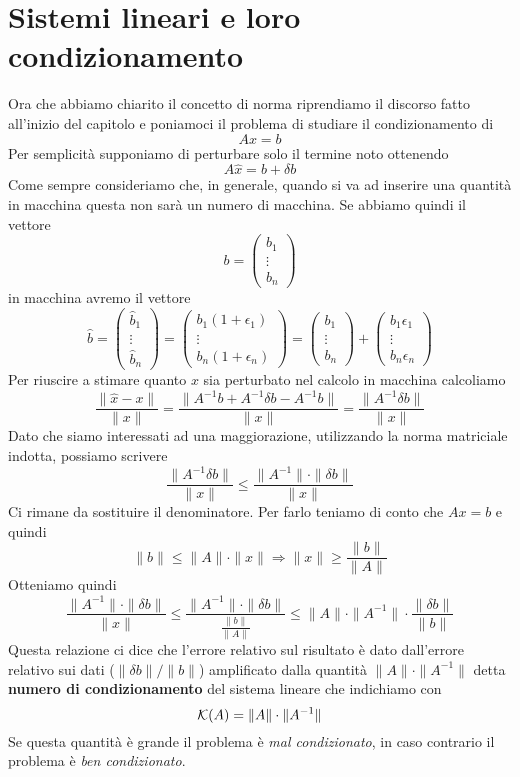 \section{Sistemi lineari e loro condizionamento}
Ora che abbiamo chiarito il concetto di norma riprendiamo il discorso fatto all'inizio del capitolo e poniamoci
il problema di studiare il condizionamento di
\[ A x = b \]
Per semplicità supponiamo di perturbare solo il termine noto ottenendo
\[ A \hat{x} = b + \delta b \]
Come sempre consideriamo che, in generale, quando si va ad inserire una quantità in macchina questa non sarà un
numero di macchina. Se abbiamo quindi il vettore
\[ b = \begin{pmatrix} b_1 \\ \vdots \\ b_n \end{pmatrix} \]
in macchina avremo il vettore
\[
	\hat{b} = \begin{pmatrix} \hat{b}_1 \\ \vdots \\ \hat{b}_n \end{pmatrix} =
	\begin{pmatrix} b_1 (1 + \epsilon_1) \\ \vdots \\ b_n (1 + \epsilon_n)	\end{pmatrix} =
	\begin{pmatrix} b_1 \\ \vdots \\ b_n \end{pmatrix} +
	\begin{pmatrix} b_1 \epsilon_1 \\ \vdots \\ b_n \epsilon_n \end{pmatrix}
\]
Per riuscire a stimare quanto $x$ sia perturbato nel calcolo in macchina calcoliamo
\[
	\frac{\| \hat{x} - x \|}{\| x \|} =
	\frac{\| A^{-1} b + A^{-1} \delta b - A^{-1} b \|}{\| x \|} =
	\frac{\| A^{-1} \delta b \|}{\| x \|}
\]
Dato che siamo interessati ad una maggiorazione, utilizzando la norma matriciale indotta, possiamo scrivere
\[ \frac{\| A^{-1} \delta b \|}{\| x \|} \leq \frac{\| A^{-1} \| \cdot \| \delta b \|}{\| x \|} \]
Ci rimane da sostituire il denominatore. Per farlo teniamo di conto che $A x = b$ e quindi
\[ \| b \| \leq \| A \| \cdot \| x \| \Rightarrow \| x \| \geq \frac{\| b \|}{\| A \|} \]
Otteniamo quindi
\[
	\frac{\| A^{-1} \| \cdot \| \delta b \|}{\| x \|} \leq
	\frac{\| A^{-1} \| \cdot \| \delta b \|}{\frac{\| b \|}{\| A \|}} \leq
	\| A \| \cdot \| A^{-1} \| \cdot \frac{\| \delta b \|}{\| b \|}
\]
Questa relazione ci dice che l'errore relativo sul risultato è dato dall'errore relativo sui dati
($\| \delta b \| / \| b \|$) amplificato dalla quantità $\| A \| \cdot \| A^{-1} \|$ detta
\textbf{numero di condizionamento} del sistema lineare che indichiamo con
\[ \mathcal{K} (A) = \| A \| \cdot \| A^{-1} \| \]
Se questa quantità è grande il problema è \emph{mal condizionato}, in caso contrario il problema è
\emph{ben condizionato}.
